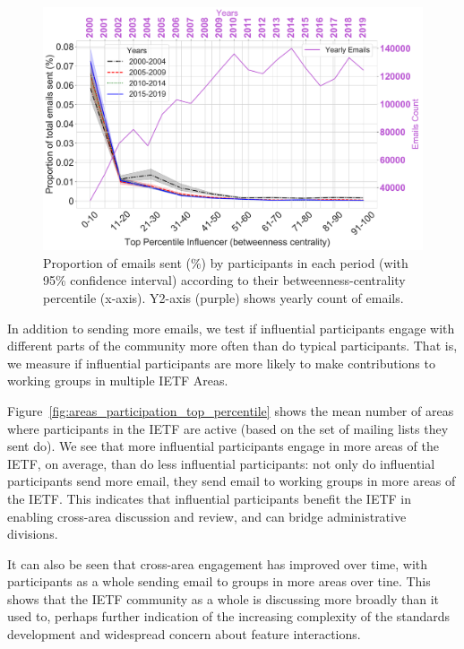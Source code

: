 \documentclass[twocolumn,10pt]{article}
\newlength{\figureWidthOneColumn}
\newcommand{\pb}[1]{\vspace{0.75ex}\noindent{\textbf{#1}}}
\begin{document}
\begin{figure}
  \centering
  \includegraphics[width=\figureWidthOneColumn]{figures-prev/icwsm-2022/lineplot_proportion_emailscount_top_percentile.pdf}
  \caption{
    Proportion of emails sent (\%) by participants in each period (with
    95\% confidence interval) according to their betweenness-centrality
    percentile (x-axis).  Y2-axis (purple) shows yearly count of emails.
  }
  \label{fig:emailcount_top_percentile}
\end{figure}

\pb{Cross-area review:} 
In addition to sending more emails, we test if influential participants
engage with different parts of the community more often than do typical
participants. That is, we measure if influential participants are more
likely to make contributions to working groups in multiple IETF Areas.

Figure~\ref{fig:areas_participation_top_percentile} shows the mean number
of areas where participants in the IETF are active (based on the set of
mailing lists they sent do). We see that more influential participants
engage in more areas of the IETF, on average, than do less influential
participants: not only do influential participants send more email, they
send email to working groups in more areas of the IETF. This indicates
that influential participants benefit the IETF in enabling cross-area
discussion and review, and can bridge administrative divisions.

It can also be seen that cross-area engagement has improved over time,
with participants as a whole sending email to groups in more areas over
tine. This shows that the IETF community as a whole is discussing more 
broadly than it used to, perhaps further indication of the increasing
complexity of the standards development and widespread concern about
feature interactions.
\end{document}
